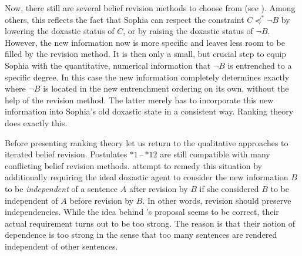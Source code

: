 Now, there still are several belief revision methods to choose from (see \citealt{r09}). Among others, this reflects the fact that Sophia can respect the constraint $C\preceq^*\neg B$ by lowering the doxastic status of $C$, or by raising the doxastic status of $\neg B$. However, the new information now is more specific and leaves less room to be filled by the revision method. It is then only a small, but crucial step to equip Sophia with the quantitative, numerical information that $\neg B$ is entrenched to a specific degree. In this case the new information completely determines exactly where $\neg B$ is located in the new entrenchment ordering on its own, without the help of the revision method. The latter merely has to incorporate this new information into Sophia's old doxastic state in a consistent way. Ranking theory does exactly this.


Before presenting ranking theory let us return to the qualitative approaches to iterated belief revision. Postulates $*1$\,--\,$*12$ are still compatible with many conflicting belief revision methods. \citet{jt07} attempt to remedy this situation by additionally requiring the ideal doxastic agent to consider the new information $B$ to be \emph{independent} of a sentence $A$ after revision by $B$ if she considered $B$ to be independent of $A$ before revision by $B$. In other words, revision should preserve independencies. While the idea behind \citet{jt07}'s proposal seems to be correct, their actual requirement turns out to be too strong. The reason is that their notion of dependence is too strong in the sense that too many sentences are rendered independent of other sentences.

